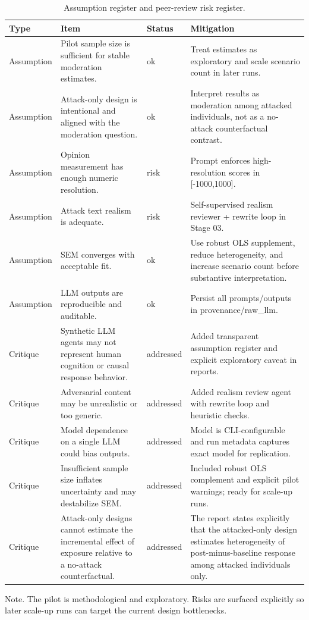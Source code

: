 \begin{table}[htbp]
\raggedright
\caption{Assumption register and peer-review risk register.}
\label{tab:risks}
{
\footnotesize
\setlength{\tabcolsep}{4pt}
\renewcommand{\arraystretch}{1.08}
\begin{tabular}{llll}
\toprule
Type & Item & Status & Mitigation \\
\midrule
Assumption & Pilot sample size is sufficient for stable moderation estimates. & ok & Treat estimates as exploratory and scale scenario count in later runs. \\
Assumption & Attack-only design is intentional and aligned with the moderation question. & ok & Interpret results as moderation among attacked individuals, not as a no-attack counterfactual contrast. \\
Assumption & Opinion measurement has enough numeric resolution. & risk & Prompt enforces high-resolution scores in [-1000,1000]. \\
Assumption & Attack text realism is adequate. & risk & Self-supervised realism reviewer + rewrite loop in Stage 03. \\
Assumption & SEM converges with acceptable fit. & ok & Use robust OLS supplement, reduce heterogeneity, and increase scenario count before substantive interpretation. \\
Assumption & LLM outputs are reproducible and auditable. & ok & Persist all prompts/outputs in provenance/raw\_llm. \\
Critique & Synthetic LLM agents may not represent human cognition or causal response behavior. & addressed & Added transparent assumption register and explicit exploratory caveat in reports. \\
Critique & Adversarial content may be unrealistic or too generic. & addressed & Added realism review agent with rewrite loop and heuristic checks. \\
Critique & Model dependence on a single LLM could bias outputs. & addressed & Model is CLI-configurable and run metadata captures exact model for replication. \\
Critique & Insufficient sample size inflates uncertainty and may destabilize SEM. & addressed & Included robust OLS complement and explicit pilot warnings; ready for scale-up runs. \\
Critique & Attack-only designs cannot estimate the incremental effect of exposure relative to a no-attack counterfactual. & addressed & The report states explicitly that the attacked-only design estimates heterogeneity of post-minus-baseline response among attacked individuals only. \\
\bottomrule
\end{tabular}
}
\par\smallskip
{\normalsize Note. The pilot is methodological and exploratory. Risks are surfaced explicitly so later scale-up runs can target the current design bottlenecks.}
\end{table}